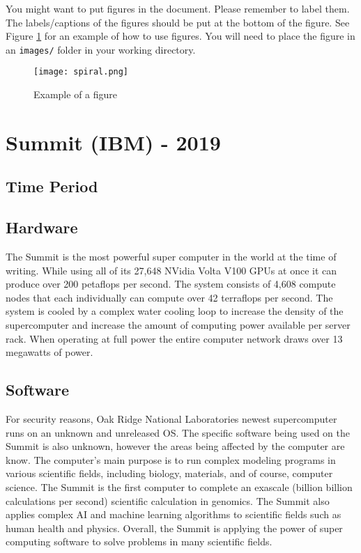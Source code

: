 \documentclass[letterpaper, 10 pt, conference]{IEEEconf}
\begin{document}
You might want to put figures in the document. Please
remember to label them. The labels/captions of the figures
should be put at the bottom of the figure. See Figure
\ref{fig:example} for an example of how to use figures.
You will need to place the figure in an \texttt{images/} folder
in your working directory.

\begin{figure}[h!]
\centering
\texttt{[image: spiral.png]}
\caption{Example of a figure}
\label{fig:example}
\end{figure} 

\section{Summit (IBM) - 2019}
\subsection{Time Period}
\subsection{Hardware}
The Summit is the most powerful super computer in the world at the time of writing. While using all of its 27,648 NVidia Volta V100 GPUs at once it can produce over 200 petaflops per second. The system consists of 4,608 compute nodes that each individually can compute over 42 terraflops per second. The system is cooled by a complex water cooling loop to increase the density of the supercomputer and increase the amount of computing power available per server rack. When operating at full power the entire computer network draws over 13 megawatts of power.
\subsection{Software}
For security reasons, Oak Ridge National Laboratories newest
supercomputer runs on an unknown and unreleased OS. The specific
software being used on the Summit is also unknown, however the
areas being affected by the computer are know. The computer's main
purpose is to run complex modeling programs in various scientific
fields, including biology, materials, and of course, computer
science. The Summit is the first computer to complete an exascale
(billion billion calculations per second) scientific calculation
in genomics. The Summit also applies complex AI and machine
learning algorithms to scientific fields such as human health and
physics. Overall, the Summit is applying the power of super
computing software to solve problems in many scientific fields.
\end{document}

